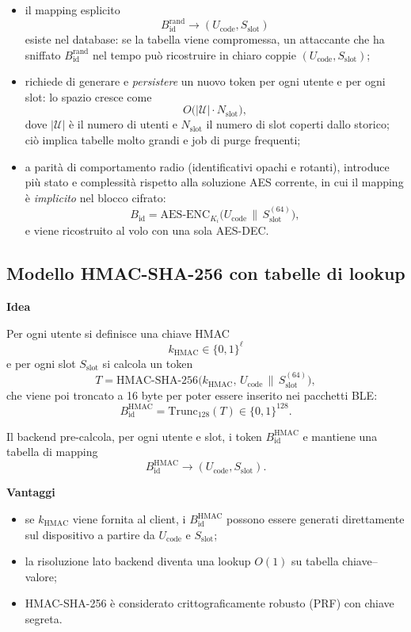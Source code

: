 \documentclass[a4paper,11pt]{article}
\begin{document}
\begin{itemize}[nosep]
  \item il mapping esplicito
        \[
          B_{\text{id}}^{\mathrm{rand}} \longrightarrow (U_{\text{code}}, S_{\text{slot}})
        \]
        esiste nel database: se la tabella viene compromessa, un attaccante che ha sniffato
        \(B_{\text{id}}^{\mathrm{rand}}\) nel tempo può ricostruire in chiaro coppie
        \((U_{\text{code}}, S_{\text{slot}})\);
  \item richiede di generare e \emph{persistere} un nuovo token per ogni utente e per ogni slot:
        lo spazio cresce come
        \[
          O\bigl(|\mathcal{U}| \cdot N_{\text{slot}}\bigr),
        \]
        dove \(|\mathcal{U}|\) è il numero di utenti e \(N_{\text{slot}}\) il numero di slot coperti
        dallo storico; ciò implica tabelle molto grandi e job di purge frequenti;
  \item a parità di comportamento radio (identificativi opachi e rotanti), introduce più stato e
        complessità rispetto alla soluzione AES corrente, in cui il mapping è \emph{implicito}
        nel blocco cifrato:
        \[
          B_{\text{id}} = \mathrm{AES\text{-}ENC}_{K_i}\bigl(U_{\text{code}} \,\|\, S_{\text{slot}}^{(64)}\bigr),
        \]
        e viene ricostruito al volo con una sola AES-DEC.
\end{itemize}

\subsection{Modello HMAC-SHA-256 con tabelle di lookup}

\textbf{Idea}

Per ogni utente si definisce una chiave HMAC
\[
  k_{\text{HMAC}} \in \{0,1\}^{\ell}
\]
e per ogni slot \(S_{\text{slot}}\) si calcola un token
\[
  T = \text{HMAC-SHA-256}\bigl(k_{\text{HMAC}},\, U_{\text{code}} \,\|\, S_{\text{slot}}^{(64)}\bigr),
\]
che viene poi troncato a 16 byte per poter essere inserito nei pacchetti BLE:
\[
  B_{\text{id}}^{\mathrm{HMAC}} = \text{Trunc}_{128}(T) \in \{0,1\}^{128}.
\]

Il backend pre-calcola, per ogni utente e slot, i token \(B_{\text{id}}^{\mathrm{HMAC}}\) e mantiene
una tabella di mapping
\[
  B_{\text{id}}^{\mathrm{HMAC}} \longrightarrow (U_{\text{code}}, S_{\text{slot}}).
\]

\textbf{Vantaggi}

\begin{itemize}[nosep]
  \item se \(k_{\text{HMAC}}\) viene fornita al client, i \(B_{\text{id}}^{\mathrm{HMAC}}\) possono
        essere generati direttamente sul dispositivo a partire da \(U_{\text{code}}\) e
        \(S_{\text{slot}}\);
  \item la risoluzione lato backend diventa una lookup \(O(1)\) su tabella chiave–valore;
  \item HMAC-SHA-256 è considerato crittograficamente robusto (PRF) con chiave segreta.
\end{itemize}
\end{document}
